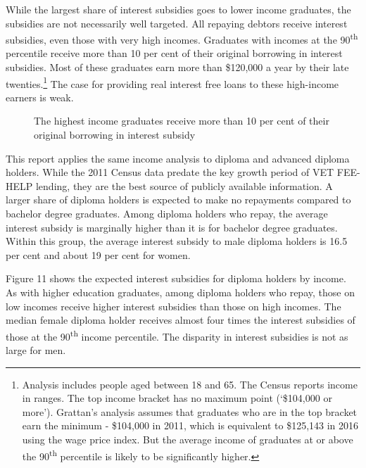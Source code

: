 \documentclass[embargoed]{grattan}
\begin{document}
While the largest share of interest subsidies goes to lower income graduates, the subsidies are not necessarily well targeted. All repaying debtors receive interest subsidies, even those with very high incomes. Graduates with incomes at the 90\textsuperscript{th} percentile receive more than 10 per cent of their original borrowing in interest subsidies. Most of these graduates earn more than \$120,000 a year by their late twenties.\footnote{Analysis includes people aged between 18 and 65. The Census reports income in ranges. The top income bracket has no maximum point (`\$104,000 or more'). Grattan's analysis assumes that graduates who are in the top bracket earn the minimum - \$104,000 in 2011, which is equivalent to \$125,143 in 2016 using the wage price index. But the average income of graduates at or above the 90\textsuperscript{th} percentile is likely to be significantly higher.} The case for providing real interest free loans to these high-income earners is weak.

\begin{figure}
\caption{The highest income graduates receive more than 10 per cent of their original borrowing in interest subsidy}\label{fig:fig10-highest-income-grads-receive-over-10pc-original-borrowing-interest-subsidy}


\end{figure}

\protect\hypertarget{_Ref312571851}{}{}This report applies the same income analysis to diploma and advanced diploma holders. While the 2011 Census data predate the key growth period of VET FEE-HELP lending, they are the best source of publicly available information. A larger share of diploma holders is expected to make no repayments compared to bachelor degree graduates. Among diploma holders who repay, the average interest subsidy is marginally higher than it is for bachelor degree graduates. Within this group, the average interest subsidy to male diploma holders is 16.5 per cent and about 19 per cent for women.

Figure 11 shows the expected interest subsidies for diploma holders by income. As with higher education graduates, among diploma holders who repay, those on low incomes receive higher interest subsidies than those on high incomes. The median female diploma holder receives almost four times the interest subsidies of those at the 90\textsuperscript{th} income percentile. The disparity in interest subsidies is not as large for men.
\end{document}
